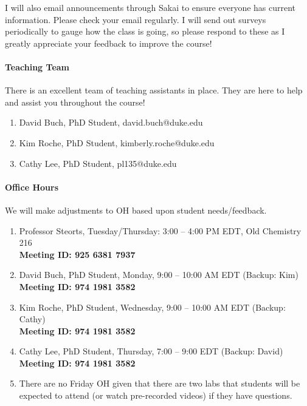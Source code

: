 \documentclass[11pt]{article}
\begin{document}
I will also email announcements through Sakai to ensure everyone has current information. Please check your email regularly. I will send out surveys periodically to gauge how the class is going, so please respond to these as I greatly appreciate your feedback to improve the course! 

\paragraph{Teaching Team}
There is an excellent team of teaching assistants in place. They are here to help and assist you throughout the course! 

\begin{enumerate}
\item David Buch, PhD Student, david.buch@duke.edu
\item Kim Roche, PhD Student, kimberly.roche@duke.edu
\item Cathy Lee, PhD Student, pl135@duke.edu
\end{enumerate}


\paragraph{Office Hours}
We will make adjustments to OH based upon student needs/feedback. 
\begin{enumerate}
\item Professor Steorts, Tuesday/Thursday: 3:00 -- 4:00 PM EDT, Old Chemistry 216\\
\textbf{Meeting ID: 925 6381 7937}
\item David Buch, PhD Student, Monday, 9:00 -- 10:00 AM EDT  (Backup: Kim)\\
\textbf{Meeting ID: 974 1981 3582}
\item Kim Roche, PhD Student, Wednesday, 9:00 -- 10:00 AM EDT  (Backup: Cathy)\\
\textbf{Meeting ID: 974 1981 3582}
\item Cathy Lee, PhD Student, Thursday, 7:00 -- 9:00 EDT (Backup: David)\\
\textbf{Meeting ID: 974 1981 3582}
\item There are no Friday OH given that there are two labs that students will be expected to attend (or watch pre-recorded videos) if they have questions. 
\end{enumerate}
\end{document}
